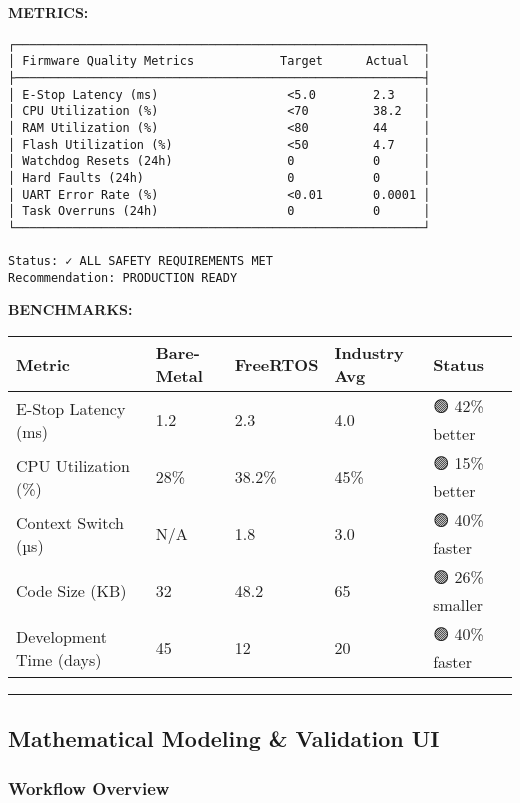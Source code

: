 \documentclass[
]{article}
\begin{document}
\textbf{METRICS:}

\begin{verbatim}
┌─────────────────────────────────────────────────────────┐
│ Firmware Quality Metrics            Target      Actual  │
├─────────────────────────────────────────────────────────┤
│ E-Stop Latency (ms)                  <5.0        2.3    │
│ CPU Utilization (%)                  <70         38.2   │
│ RAM Utilization (%)                  <80         44     │
│ Flash Utilization (%)                <50         4.7    │
│ Watchdog Resets (24h)                0           0      │
│ Hard Faults (24h)                    0           0      │
│ UART Error Rate (%)                  <0.01       0.0001 │
│ Task Overruns (24h)                  0           0      │
└─────────────────────────────────────────────────────────┘

Status: ✓ ALL SAFETY REQUIREMENTS MET
Recommendation: PRODUCTION READY
\end{verbatim}

\textbf{BENCHMARKS:}

\begin{longtable}[]{@{}lllll@{}}
\toprule\noalign{}
Metric & Bare-Metal & FreeRTOS & Industry Avg & Status \\
\midrule\noalign{}
\endhead
\bottomrule\noalign{}
\endlastfoot
E-Stop Latency (ms) & 1.2 & 2.3 & 4.0 & 🟢 42\% better \\
CPU Utilization (\%) & 28\% & 38.2\% & 45\% & 🟢 15\% better \\
Context Switch (µs) & N/A & 1.8 & 3.0 & 🟢 40\% faster \\
Code Size (KB) & 32 & 48.2 & 65 & 🟢 26\% smaller \\
Development Time (days) & 45 & 12 & 20 & 🟢 40\% faster \\
\end{longtable}

\begin{center}\rule{0.5\linewidth}{0.5pt}\end{center}

\hypertarget{mathematical-modeling-validation-ui}{%
\subsection{Mathematical Modeling \& Validation
UI}\label{mathematical-modeling-validation-ui}}

\hypertarget{workflow-overview-3}{%
\subsubsection{Workflow Overview}\label{workflow-overview-3}}
\end{document}
